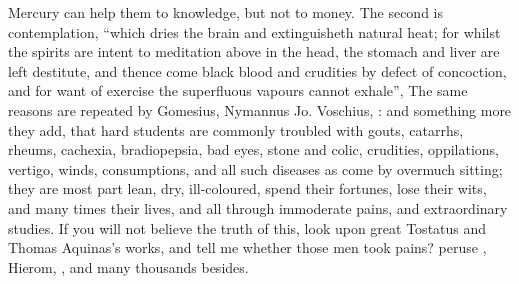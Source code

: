 Mercury can help them to knowledge, but not to money. The second is
contemplation, \enquote{which dries the brain and extinguisheth
natural heat; for whilst the spirits are intent to meditation above in the
head, the stomach and liver are left destitute, and thence come black blood and
crudities by defect of concoction, and for want of exercise the superfluous
vapours cannot exhale}, \etc{} The same reasons are repeated by Gomesius,
 Nymannus
 Jo. Voschius, : and something more they add, that hard students are
commonly troubled with gouts, catarrhs, rheums, cachexia, bradiopepsia, bad
eyes, stone and colic, crudities, oppilations, vertigo,
winds, consumptions, and all such diseases as come by overmuch sitting; they
are most part lean, dry, ill-coloured, spend their fortunes, lose their wits,
and many times their lives, and all through immoderate pains, and extraordinary
studies. If you will not believe the truth of this, look upon great Tostatus
and Thomas Aquinas's works, and tell me whether those men took pains? peruse
\Austin{}, Hierom, \etc{}, and many thousands besides.


